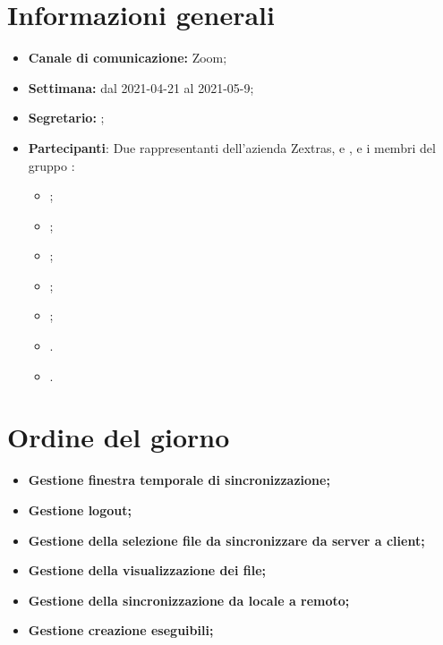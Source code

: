 \section{Informazioni generali}

\begin{itemize}

    \item \textbf{Canale di comunicazione:} Zoom;

    \item \textbf{Settimana:} dal 2021-04-21 al 2021-05-9;

    \item \textbf{Segretario:} \ACapoRedazione{};

    \item \textbf{Partecipanti}: Due rappresentanti dell'azienda Zextras, \textit{\Alessio{}} e \textit{\Federico{}}, e i membri del gruppo \Gruppo{}:
        \begin{itemize}
            \item \Daniele{};
            \item \Davide{};
            \item \Francesco{};
            \item \Tommaso{};
            \item \Lucrezia{};  
            \item \Matteo{}.
            \item \Giosue{}.
        \end{itemize}
\end{itemize}

\section{Ordine del giorno}

\begin{itemize}
    \item\textbf{Gestione finestra temporale di sincronizzazione;}
    \item\textbf{Gestione logout;}
    \item\textbf{Gestione della selezione file da sincronizzare da server a client;}
        \item\textbf{Gestione della visualizzazione dei file;}
    \item\textbf{Gestione della sincronizzazione da locale a remoto;}
    \item\textbf{Gestione creazione eseguibili;}
\end{itemize}
\newpage


